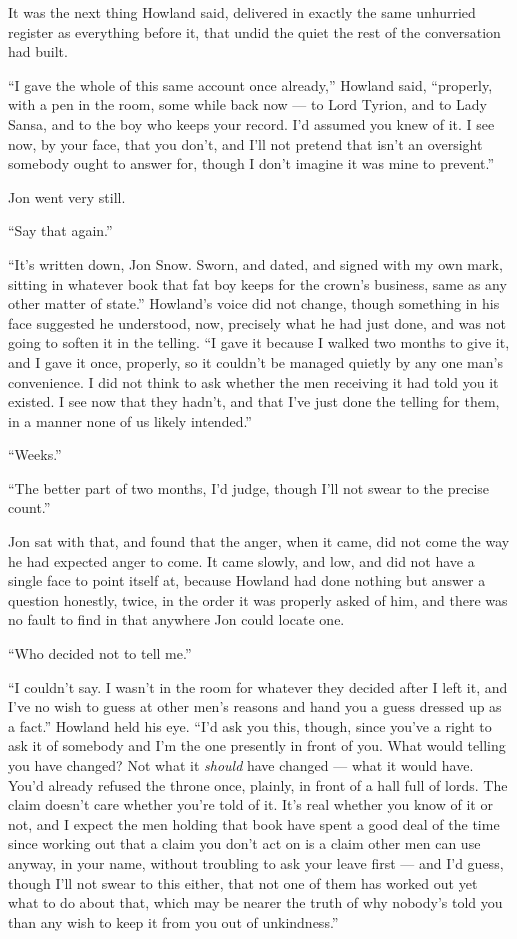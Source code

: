 \sceneBreak

It was the next thing Howland said, delivered in exactly the same unhurried register as everything before it, that undid the quiet the rest of the conversation had built.

“I gave the whole of this same account once already,” Howland said, “properly, with a pen in the room, some while back now — to Lord Tyrion, and to Lady Sansa, and to the boy who keeps your record. I’d assumed you knew of it. I see now, by your face, that you don’t, and I’ll not pretend that isn’t an oversight somebody ought to answer for, though I don’t imagine it was mine to prevent.”

Jon went very still.

“Say that again.”

“It’s written down, Jon Snow. Sworn, and dated, and signed with my own mark, sitting in whatever book that fat boy keeps for the crown’s business, same as any other matter of state.” Howland’s voice did not change, though something in his face suggested he understood, now, precisely what he had just done, and was not going to soften it in the telling. “I gave it because I walked two months to give it, and I gave it once, properly, so it couldn’t be managed quietly by any one man’s convenience. I did not think to ask whether the men receiving it had told you it existed. I see now that they hadn’t, and that I’ve just done the telling for them, in a manner none of us likely intended.”

“Weeks.”

“The better part of two months, I’d judge, though I’ll not swear to the precise count.”

Jon sat with that, and found that the anger, when it came, did not come the way he had expected anger to come. It came slowly, and low, and did not have a single face to point itself at, because Howland had done nothing but answer a question honestly, twice, in the order it was properly asked of him, and there was no fault to find in that anywhere Jon could locate one.

“Who decided not to tell me.”

“I couldn’t say. I wasn’t in the room for whatever they decided after I left it, and I’ve no wish to guess at other men’s reasons and hand you a guess dressed up as a fact.” Howland held his eye. “I’d ask you this, though, since you’ve a right to ask it of somebody and I’m the one presently in front of you. What would telling you have changed? Not what it \textit{should} have changed — what it would have. You’d already refused the throne once, plainly, in front of a hall full of lords. The claim doesn’t care whether you’re told of it. It’s real whether you know of it or not, and I expect the men holding that book have spent a good deal of the time since working out that a claim you don’t act on is a claim other men can use anyway, in your name, without troubling to ask your leave first — and I’d guess, though I’ll not swear to this either, that not one of them has worked out yet what to do about that, which may be nearer the truth of why nobody’s told you than any wish to keep it from you out of unkindness.”

